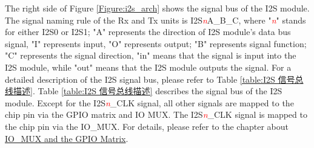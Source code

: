 \documentclass[main\_\_EN.tex]{subfiles}
\begin{document}
The right side of Figure \ref{Figure:i2s_arch} shows the signal bus of the I2S module. The signal naming rule of the Rx and Tx units is I2S\textcolor{red}{\it{n}}A\_B\_C, where "\textcolor{red}{\it{n}}" stands for either I2S0 or I2S1; "A" represents the direction of I2S module's data bus signal, "I" represents input, "O" represents output; "B" represents signal function; "C" represents the signal direction, "in" means that the signal is input into the I2S module, while "out" means that the I2S module outputs the signal. For a detailed description of the I2S signal bus, please refer to Table \ref{table:I2S 信号总线描述}. Table \ref{table:I2S 信号总线描述} describes the signal bus of the I2S module. Except for the I2S\textcolor{red}{\it{n}}\_CLK signal, all other signals are mapped to the chip pin via the GPIO matrix and IO MUX. The I2S\textcolor{red}{\it{n}}\_CLK signal is mapped to the chip pin via the IO\_MUX. For details, please refer to the chapter about \hyperref[mod:iomuxgpio]{IO\_MUX and the GPIO Matrix}.
\end{document}
